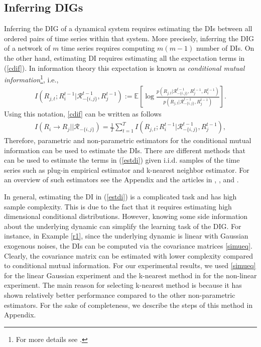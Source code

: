 \subsection{Inferring  DIGs}
Inferring the DIG of a dynamical system requires estimating the DIs between all ordered pairs of time series within that system. More precisely, inferring the DIG of a network of $m$ time series requires computing $m(m-1)$ number of DIs. 
On the other hand, estimating DI  requires estimating all the expectation terms in (\ref{cdif}).
In information theory this expectation is known as \textit{conditional mutual information}\footnote{For more details see \citet{cover2012elements}.}, i.e., 
\begin{align}
    I(R_{j,t};R_{i}^{t-1}|\mathcal{R}^{t-1}_{-\{i,j\}},R^{t-1}_{j}):=\mathbb{E}\left[\log\frac{p(R_{j,t}|\mathcal{R}^{t-1}_{-\{i,j\}},R_{j}^{t-1},R_{i}^{t-1})}{p(R_{j,t}|\mathcal{R}^{t-1}_{-\{i,j\}},R_{j}^{t-1})}\right].
\end{align}
Using this notation, \eqref{cdif} can be written as follows 
\begin{align}\label{estdi}
I(R_i\rightarrow R_j||\mathcal{R}_{-\{i,j\}})=\frac{1}{T}\sum_{t=1}^T I(R_{j,t};R_{i}^{t-1}|\mathcal{R}^{t-1}_{-\{i,j\}},R^{t-1}_{j}),
\end{align}
Therefore, parametric and non-parametric estimators for the conditional mutual information can be used to estimate the DIs. 
There are different methods that can be used to estimate the terms in (\ref{estdi}) given i.i.d. samples of the time series such as plug-in empirical estimator and k-nearest neighbor estimator. For an overview of such estimators see the Appendix and the articles in \citet{paninski2003estimation}, \citet{noshad2019scalable}, and \citet{jiao2013universal}. 
 
 
 In general, estimating the DI in (\ref{estdi}) is a complicated task and has high sample complexity.
 This is due to the fact that it requires estimating high dimensional conditional distributions. 
However, knowing some side information about the underlying dynamic can simplify the learning task of the DIG. 
For instance, in Example \ref{r1}, since the underlying dynamic is linear with Gaussian exogenous noises, the DIs can be computed via the covariance matrices \eqref{simueq}. 
Clearly, the covariance matrix can be estimated with lower complexity compared to conditional mutual information. 
For our experimental results, we used \eqref{simueq} for the linear Gaussian experiment and  the k-nearest method in \citet{sricharan2011k} for the non-linear experiment. 
The main reason for selecting k-nearest method is because it has shown relatively better performance compared to the other non-parametric estimators. 
For the sake of completeness, we describe the steps of this method in Appendix.

